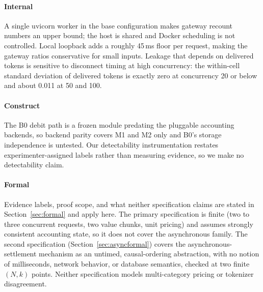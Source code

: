 \documentclass[manuscript,review]{acmart}
\begin{document}
\paragraph{Internal}
A single uvicorn worker in the base configuration makes gateway recount numbers an upper
bound; the host is shared and Docker scheduling is not controlled. Local loopback adds a
roughly 45\,ms floor per request, making the gateway ratios conservative for small
inputs. Leakage that depends on delivered tokens is sensitive to
disconnect timing at high concurrency: the within-cell standard deviation of delivered
tokens is exactly zero at concurrency 20 or below and about 0.011 at 50 and 100.

\paragraph{Construct}
The B0 debit path is a frozen module predating the pluggable accounting backends, so
backend parity covers M1 and M2 only and B0's storage independence is untested. Our detectability instrumentation restates
experimenter-assigned labels rather than measuring evidence, so we make no detectability
claim.

\paragraph{Formal}
Evidence labels, proof scope, and what neither specification claims are stated in
Section~\ref{sec:formal} and apply here. The primary specification is
finite (two to three concurrent requests, two value chunks, unit pricing) and assumes
strongly consistent accounting state, so it does not cover the asynchronous family. The
second specification (Section~\ref{sec:asyncformal}) covers the asynchronous-settlement
mechanism as an untimed, causal-ordering abstraction, with no notion of milliseconds,
network behavior, or database semantics, checked at two finite $(N,k)$ points. Neither
specification models multi-category pricing or tokenizer disagreement.
\end{document}
